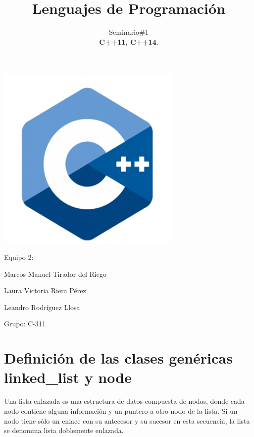 \documentclass[10pt]{article}
\title{\textbf{Lenguajes de Programaci\'on}}
\author{Seminario\#1\\
 \textbf{C++11, C++14}.}
\date{}
\begin{document}
	\begin{titlepage}
		\clearpage	
		\maketitle
		\begin{center}
			\includegraphics[width=9cm]{c++logo.png}
			
			\vspace{5em}
			Equipo 2:
			
			Marcos Manuel Tirador del Riego
			
			Laura Victoria Riera P\'erez
			
			Leandro Rodr\'iguez Llosa
			\vspace{1em}
			
			Grupo: C-311
		\end{center}
		\thispagestyle{empty}
	\end{titlepage}


\newpage
{}
\tableofcontents
\thispagestyle{empty}

\newpage
{}
\section{Definici\'on de las clases genéricas linked\_list y node}

Una lista enlazada es una estructura de datos compuesta de nodos, donde cada nodo contiene alguna información y un puntero a otro nodo de la lista. Si un nodo tiene sólo un enlace con su antecesor y su sucesor en esta secuencia, la lista se denomina lista doblemente enlazada.


\end{document}
